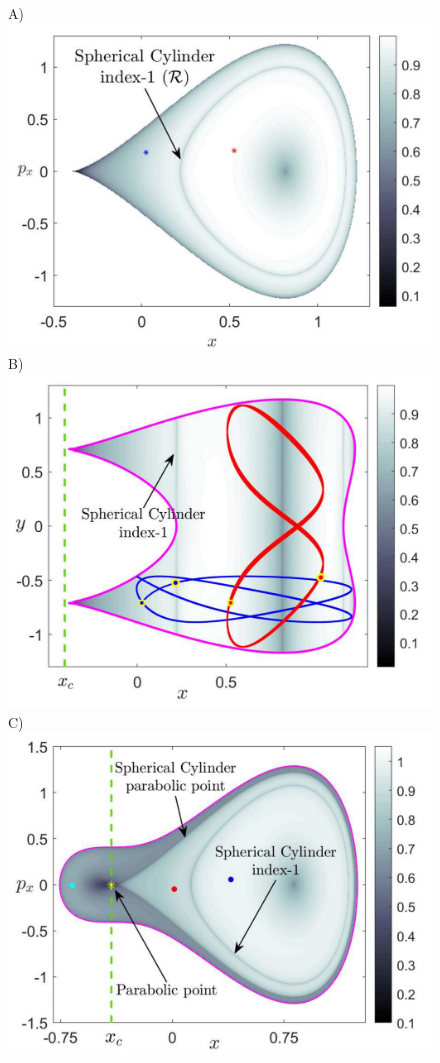 \documentclass[10pt,aps,onecolumn,superscriptaddress]{revtex4-2}
\begin{document}
\begin{figure}[htbp]
	\begin{center}
		A)\includegraphics[scale=0.27]{LD_tau_5_y_-1sqrt2_delta_bif_H_-1div6}
		B)\includegraphics[scale=0.27]{LD_tau_5_px_0_delta_bif_H_-1div6}
		C)\includegraphics[scale=0.27]{LD_tau_5_y_-1sqrt2_delta_bif_H_-1div12}

\end{center}
\end{figure}
\end{document}
